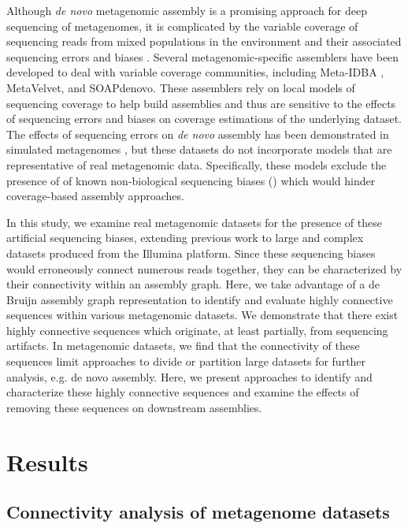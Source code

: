\documentclass[10pt]{article}
\begin{document}
Although \emph{de novo} metagenomic assembly is a promising approach for deep sequencing of metagenomes, it is complicated by the variable coverage of sequencing reads from mixed populations in the environment and their associated sequencing errors and biases \cite{Mende:2012p1262,Pignatelli:2011p742}. Several metagenomic-specific assemblers have been developed to deal with variable coverage communities, including Meta-IDBA \cite{Peng:2011p898}, MetaVelvet, and SOAPdenovo.  These assemblers rely on local models of sequencing coverage to help build assemblies and thus are sensitive to the effects of sequencing errors and biases on coverage estimations of the underlying dataset. The effects of sequencing errors on \emph{de novo} assembly has been demonstrated in simulated metagenomes \cite{Mavromatis:2006p894,Mende:2012p1262,Pignatelli:2011p742}, but these datasets do not incorporate models that are representative of real metagenomic data.  Specifically, these models exclude the presence of of known non-biological sequencing biases (\cite{GomezAlvarez:2009p1334,Keegan:2012p1336,Niu:2010p1333}) which would hinder coverage-based assembly approaches.  

In this study, we examine real metagenomic datasets for the presence of these artificial sequencing biases, extending previous work to large and complex datasets produced from the Illumina platform. Since these sequencing biases would erroneously connect numerous reads together, they can be characterized by their connectivity within an assembly graph.  Here, we take advantage of a de Bruijn assembly graph representation to identify and evaluate highly connective sequences within various metagenomic datasets.  We demonstrate that there exist highly connective sequences which originate, at least partially, from sequencing artifacts.  In metagenomic datasets, we find that the connectivity of these sequences limit approaches to divide or partition large datasets for further analysis, e.g. {de novo} assembly.  Here, we present approaches to identify and characterize these highly connective sequences and examine the effects of removing these sequences on downstream assemblies.

\section*{Results}

\subsection*{Connectivity analysis of metagenome datasets}
\end{document}
